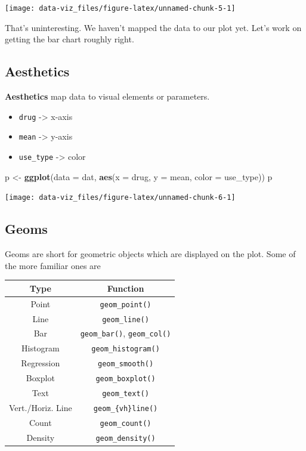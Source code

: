 \documentclass[]{book}
\newenvironment{Shaded}{\begin{snugshade}}{\end{snugshade}}
\newcommand{\KeywordTok}[1]{\textcolor[rgb]{0.13,0.29,0.53}{\textbf{#1}}}
\newcommand{\DataTypeTok}[1]{\textcolor[rgb]{0.13,0.29,0.53}{#1}}
\newcommand{\StringTok}[1]{\textcolor[rgb]{0.31,0.60,0.02}{#1}}
\newcommand{\NormalTok}[1]{#1}
\providecommand{\tightlist}{%
  \setlength{\itemsep}{0pt}\setlength{\parskip}{0pt}}
\theoremstyle{definition}
\theoremstyle{definition}
\theoremstyle{definition}
\theoremstyle{remark}
\begin{document}
\begin{center}\texttt{[image: data-viz\_files/figure-latex/unnamed-chunk-5-1]} \end{center}

That's uninteresting. We haven't mapped the data to our plot yet. Let's
work on getting the bar chart roughly right.

\subsection{Aesthetics}\label{aesthetics}

\textbf{Aesthetics} map data to visual elements or parameters.

\begin{itemize}
\tightlist
\item
  \texttt{drug} -\textgreater{} x-axis
\item
  \texttt{mean} -\textgreater{} y-axis
\item
  \texttt{use\_type} -\textgreater{} color
\end{itemize}

\begin{Shaded}
\begin{Highlighting}[]
\NormalTok{p <-}\StringTok{ }\KeywordTok{ggplot}\NormalTok{(}\DataTypeTok{data =}\NormalTok{ dat, }\KeywordTok{aes}\NormalTok{(}\DataTypeTok{x =}\NormalTok{ drug, }\DataTypeTok{y =}\NormalTok{ mean, }\DataTypeTok{color =}\NormalTok{ use_type)) }
\NormalTok{p}
\end{Highlighting}
\end{Shaded}

\begin{center}\texttt{[image: data-viz\_files/figure-latex/unnamed-chunk-6-1]} \end{center}

\subsection{Geoms}\label{geoms}

Geoms are short for geometric objects which are displayed on the plot.
Some of the more familiar ones are

\begin{longtable}[]{@{}cc@{}}
\toprule
Type & Function\tabularnewline
\midrule
\endhead
Point & \texttt{geom\_point()}\tabularnewline
Line & \texttt{geom\_line()}\tabularnewline
Bar & \texttt{geom\_bar()}, \texttt{geom\_col()}\tabularnewline
Histogram & \texttt{geom\_histogram()}\tabularnewline
Regression & \texttt{geom\_smooth()}\tabularnewline
Boxplot & \texttt{geom\_boxplot()}\tabularnewline
Text & \texttt{geom\_text()}\tabularnewline
Vert./Horiz. Line & \texttt{geom\_\{vh\}line()}\tabularnewline
Count & \texttt{geom\_count()}\tabularnewline
Density & \texttt{geom\_density()}\tabularnewline
\bottomrule
\end{longtable}
\end{document}
